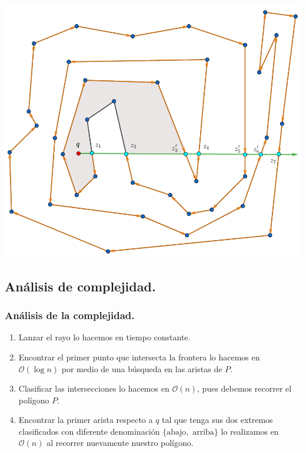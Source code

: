 \begin{frame}
  \centering \includegraphics[width=0.45 \paperwidth]{images/Poda/12.png}
\end{frame}
\subsection{Análisis de complejidad.}

\begin{frame}
  \frametitle{Análisis de la complejidad.}
  \begin{enumerate}
  \item Lanzar el rayo lo hacemos en tiempo constante.
  \item Encontrar el primer punto que intersecta la frontera lo hacemos en $\mathcal{O}(\log n)$
    por medio de una búsqueda en las aristas de $P$.
  \item Clasificar las intersecciones lo hacemos en $\mathcal{O}(n)$, pues debemos recorrer el
    polígono $P$.
  \item Encontrar la primer arista respecto a $q$ tal que tenga sus dos extremos clasificados con
    diferente denominación $\{\text{abajo}, \text{ arriba}\}$ lo realizamos en $\mathcal{O}(n)$
    al recorrer nuevamente nuestro polígono.
  \end{enumerate}
\end{frame}
